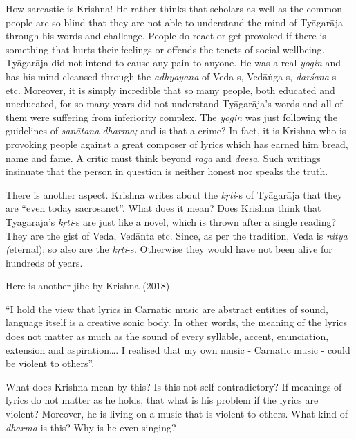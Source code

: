 How sarcastic is Krishna! He rather thinks that scholars as well as the common people are so blind that they are not able to understand the mind of Tyāgarāja through his words and challenge. People do react or get provoked if there is something that hurts their feelings or offends the tenets of social wellbeing. Tyāgarāja did not intend to cause any pain to anyone. He was a real \textit{yogin} and has his mind cleansed through the \textit{adhyayana} of Veda-s, Vedāṅga-s, \textit{darśana}-s etc. Moreover, it is simply incredible that so many people, both educated and uneducated, for so many years did not understand Tyāgarāja’s words and all of them were suffering from inferiority complex. The \textit{yogin} was just following the guidelines of \textit{sanātana dharma;} and is that a crime? In fact, it is Krishna who is provoking people against a great composer of lyrics which has earned him bread, name and fame. A critic must think beyond \textit{rāga} and \textit{dveṣa}. Such writings insinuate that the person in question is neither honest nor speaks the truth. 

There is another aspect. Krishna writes about the \textit{kṛti}-s of Tyāgarāja that they are “even today sacrosanct”. What does it mean? Does Krishna think that Tyāgarāja’s \textit{kṛti}-s are just like a novel, which is thrown after a single reading? They are the gist of Veda, Vedānta etc. Since, as per the tradition, Veda is \textit{nitya (}eternal); so also are the \textit{kṛti}-s. Otherwise they would have not been alive for hundreds of years. 

Here is another jibe by Krishna (2018) -

\begin{myquote}
“I hold the view that lyrics in Carnatic music are abstract entities of sound, language itself is a creative sonic body. In other words, the meaning of the lyrics does not matter as much as the sound of every syllable, accent, enunciation, extension and aspiration…. I realised that my own music - Carnatic music - could be violent to others”.
\end{myquote}

What does Krishna mean by this? Is this not self-contradictory? If meanings of lyrics do not matter as he holds, that what is his problem if the lyrics are violent? Moreover, he is living on a music that is violent to others. What kind of \textit{dharma} is this? Why is he even singing?

